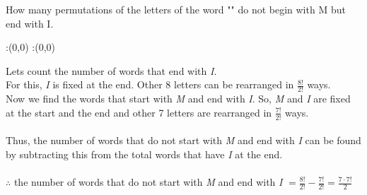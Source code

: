 



\question How many permutations of the letters of the word "\vbone" do not begin with M but end with I.



\ifprintanswers
  \begin{marginfigure}
      :(0,0)
      :(0,0)
    \figdrawbegin{}
      \figdrawline [100,101]
    \figdrawend
    \figvisu{\figBoxA}{}{%
    }
    \centerline{\box\figBoxA}
  \end{marginfigure}
\fi 

\begin{solution}
Lets count the number of words that end with \textit{I}.\\
For this, \textit{I} is fixed at the end. Other 8 letters can be rearranged in $\frac{8!}{2!}$ ways.\\
Now we find the words that start with \textit{M} and end with \textit{I}. So, \textit{M} and \textit{I} are fixed at the start and the end and other 7 letters are rearranged in $\frac{7!}{2!}$ ways.\\ \\
Thus, the number of words that do not start with \textit{M} and end with \textit{I} can be found by subtracting this from the total words that have \textit{I} at the end. \\ \\                                                                                            
$\therefore$ the number of words that do not start with \textit{M} and end with \textit{I} $=\frac{8!}{2!} - \frac{7!}{2!}  =  \frac{7\cdot7!}{2}$
\end{solution}


